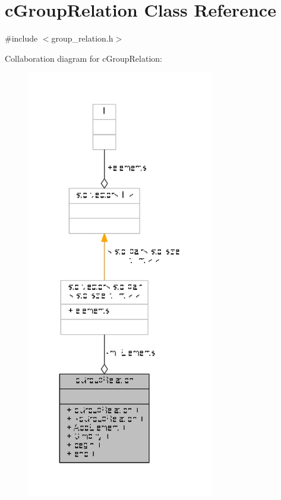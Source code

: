 \hypertarget{classcGroupRelation}{\section{c\-Group\-Relation Class Reference}
\label{classcGroupRelation}
}


{\ttfamily \#include $<$group\-\_\-relation.\-h$>$}



Collaboration diagram for c\-Group\-Relation\-:
\nopagebreak
\begin{figure}[H]
\begin{center}
\leavevmode
\includegraphics[width=232pt]{classcGroupRelation__coll__graph}
\end{center}
\end{figure}
